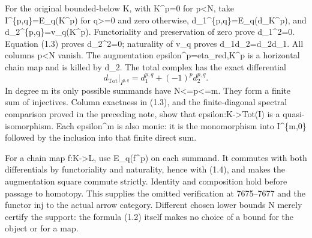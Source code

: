 For the original bounded-below K,\allowbreak{} with K\textasciicircum{}p\allowbreak{}=0 for p<N,\allowbreak{} take I\textasciicircum{}\{p,\allowbreak{}q\}\allowbreak{}=E\_\allowbreak{}q(K\textasciicircum{}p)\allowbreak{} for q>\allowbreak{}=0 and zero otherwise,\allowbreak{} d\_\allowbreak{}1\textasciicircum{}\{p,\allowbreak{}q\}\allowbreak{}=E\_\allowbreak{}q(d\_\allowbreak{}K\textasciicircum{}p)\allowbreak{},\allowbreak{} and d\_\allowbreak{}2\textasciicircum{}\{p,\allowbreak{}q\}\allowbreak{}=v\_\allowbreak{}q(K\textasciicircum{}p)\allowbreak{}. Functoriality and preservation of zero prove d\_\allowbreak{}1\textasciicircum{}2\allowbreak{}=0. Equation (1.3)\allowbreak{} proves d\_\allowbreak{}2\textasciicircum{}2\allowbreak{}=0; naturality of v\_\allowbreak{}q proves d\_\allowbreak{}1d\_\allowbreak{}2\allowbreak{}=d\_\allowbreak{}2d\_\allowbreak{}1. All columns p\textless N vanish. The augmentation epsilon\textasciicircum{}p\allowbreak{}=eta\_\allowbreak{}red,\allowbreak{}K\textasciicircum{}p is a horizontal chain map and is killed by d\_\allowbreak{}2. The total complex has the exact differential \[
 d_{\operatorname{Tot}}|_{I^{p,q}}=d_1^{p,q}+(-1)^p d_2^{p,q}.
                                                               \tag{1.4}
\] In degree m its only possible summands have N<\allowbreak{}=p<\allowbreak{}=m. They form a finite sum of injectives. Column exactness in (1.3)\allowbreak{},\allowbreak{} and the finite-diagonal spectral comparison proved in the preceding note,\allowbreak{} show that epsilon:\allowbreak{}K\allowbreak{}->Tot(I)\allowbreak{} is a quasi-isomorphism. Each epsilon\^{}m is also monic:\allowbreak{} it is the monomorphism into I\textasciicircum{}\{m,\allowbreak{}0\} followed by the inclusion into that finite direct sum.

For a chain map f:\allowbreak{}K\allowbreak{}->L,\allowbreak{} use E\_\allowbreak{}q(f\textasciicircum{}p)\allowbreak{} on each summand. It commutes with both differentials by functoriality and naturality,\allowbreak{} hence with (1.4)\allowbreak{},\allowbreak{} and makes the augmentation square commute strictly. Identity and composition hold before passage to homotopy. This supplies the omitted verification at 7675–\allowbreak{}7677 and the functor inj to the actual arrow category. Different chosen lower bounds N merely certify the support:\allowbreak{} the formula (1.2)\allowbreak{} itself makes no choice of a bound for the object or for a map.

